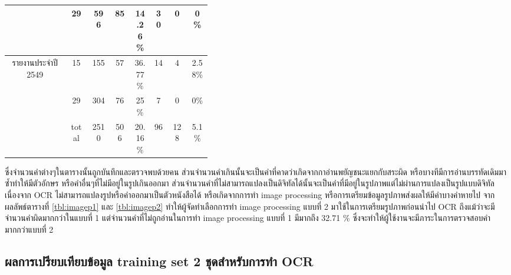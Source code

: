 \begin{table}[H]
\begin{tabular}{|c|c|c|p{0.1\linewidth}|p{0.1\linewidth}|c|p{0.1\linewidth}|p{0.1\linewidth}|}
                                                & 29                         & \multicolumn{1}{c|}{596 }      & \multicolumn{1}{c|}{85 }         & \multicolumn{1}{c|}{14.26\%} & \multicolumn{1}{c|}{30}     & \multicolumn{1}{c|}{0  }             & \multicolumn{1}{c|}{0\%    } \\ \hline
            \multirow{2}{*}{รายงานประจำปี 2549}   & 15                         & \multicolumn{1}{c|}{155 }      & \multicolumn{1}{c|}{57 }         & \multicolumn{1}{c|}{36.77\%} & \multicolumn{1}{c|}{14}     & \multicolumn{1}{c|}{4  }             & \multicolumn{1}{c|}{2.58\% } \\ \cline{2-8} 
                                                & 29                         & \multicolumn{1}{c|}{304 }      & \multicolumn{1}{c|}{76 }         & \multicolumn{1}{c|}{25\%   } & \multicolumn{1}{c|}{7 }     & \multicolumn{1}{c|}{0  }             & \multicolumn{1}{c|}{0\%    } \\ \hline
            \multicolumn{1}{|l|}{}              & \multicolumn{1}{c|}{total} & \multicolumn{1}{c|}{2510}      & \multicolumn{1}{c|}{506}         & \multicolumn{1}{c|}{20.16\%} & \multicolumn{1}{c|}{96}     & \multicolumn{1}{c|}{128}             & \multicolumn{1}{c|}{5.1\%  } \\ \hline
            \end{tabular}
            \end{table}
ซึ่งจำนวนคำต่างๆในตารางนั้นถูกบันทึกและตรวจพบด้วยคน ส่วนจำนวนคำเกินนั้นจะเป็นคำที่คาดว่าเกิดจากกาอ่านพยัญชนะแยกกับสระผิด หรือบางทีมีการอ่านบรรทัดเดิมมาซ้ำทำให้มีตัวอักษร หรือคำอื่นๆที่ไม่มีอยู่ในรูปเกินออกมา
ส่วนจำนวนคำที่ไม่สามารถแปลงเป็นดิจิทัลได้นั้นจะเป็นคำที่มีอยู่ในรูปภาพแต่ไม่ผ่านการแปลงเป็นรูปแบบดิจิทัล เนื่องจาก OCR ไม่สามารถแปลงรูปหรือคำออกมาเป็นตัวหนังสือได้ หรือเกิดจากการทำ image processing 
หรือการเตรียมข้อมูลรูปภาพส่งผลให้มีคำบางคำหายไป
จากผลลัพธ์ตารางที่ \ref{tbl:imagep1} และ \ref{tbl:imagep2} ทำให้ผู้จัดทำเลือกการทำ image processing แบบที่ 2 มาใช้ในการเตรียมรูปภาพก่อนนำไป OCR
ถึงแม้ว่าจะมีจำนวนคำผิดมากกว่าในแบบที่ 1 แต่จำนวนคำที่ไม่ถูกอ่านในการทำ image processing แบบที่ 1 มีมากถึง 32.71 \% ซึ่งจะทำให้ผู้ใช้งานจะมีภาระในการตรวจสอบคำมากกว่าแบบที่ 2 

\subsection{ผลการเปรียบเทียบข้อมูล training set 2 ชุดสำหรับการทำ OCR}

